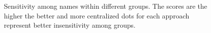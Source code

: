 \begin{figure}[t]
	
	\begin{minipage}[t]{\linewidth}
		\centering
	\end{minipage}%
	
	\begin{minipage}[t]{\linewidth}
		\centering
	\end{minipage}
	\centering
	\caption{Sensitivity among names within different groups. The scores are the higher the better and more centralized dots for each approach represent better insensitivity among groups. }%
	\label{fig:groups}
\end{figure}

